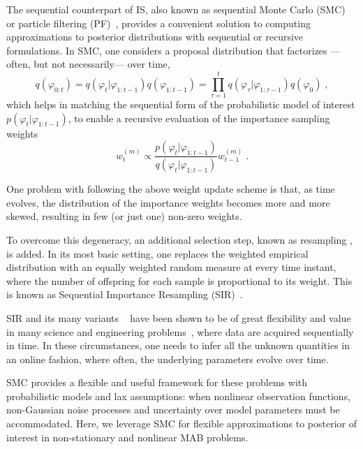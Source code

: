 The sequential counterpart of IS,
also known as sequential Monte Carlo (SMC)~\citep{b-Doucet2001}
or particle filtering (PF)~\citep{ib-Djuric2010},
provides a convenient solution to computing approximations to posterior distributions
with sequential or recursive formulations.
%
In SMC, one considers a proposal distribution that factorizes
---often, but not necessarily--- over time, \ie
\begin{equation}
q(\varphi_{0:t})=q(\varphi_t|\varphi_{1:t-1}) q(\varphi_{1:t-1})=\prod_{\tau=1}^{t} q(\varphi_{\tau}|\varphi_{1:\tau-1}) q(\varphi_0) \; ,
\end{equation}
which helps in matching the sequential form of the probabilistic model of interest $p(\varphi_t|\varphi_{1:t-1})$,
to enable a recursive evaluation of the importance sampling weights
\begin{equation}
w_t^{(m)} \propto \frac{p(\varphi_{t}|\varphi_{1:t-1})}{q(\varphi_{t}|\varphi_{1:t-1})} w_{t-1}^{(m)} \; .
\end{equation}

One problem with following the above weight update scheme is that,
as time evolves, the distribution of the importance weights becomes more and more skewed,
resulting in few (or just one) non-zero weights.

To overcome this degeneracy, an additional selection step, known as resampling \citep{j-Li2015}, is added.
In its most basic setting,
one replaces the weighted empirical distribution with an equally weighted random measure at every time instant,
where the number of offspring for each sample is proportional to its weight.
This is known as Sequential Importance Resampling (SIR)~\citep{j-Gordon1993}.

SIR and its many variants ~\citep{b-Doucet2001,j-Arulampalam2002}
have been shown to be of great flexibility and value
in many science and engineering problems~\citep{b-Ristic2004,j-Leeuwen2009,j-Ionides2006,j-Creal2012},
where data are acquired sequentially in time.
In these circumstances,
one needs to infer all the unknown quantities in an online fashion,
where often, the underlying parameters evolve over time.

SMC provides a flexible and useful framework
for these problems with probabilistic models and lax assumptions:
\ie when nonlinear observation functions, non-Gaussian noise processes and uncertainty over model parameters must be accommodated.
%
Here, we leverage SMC for flexible approximations to posterior of interest in non-stationary and nonlinear MAB problems.